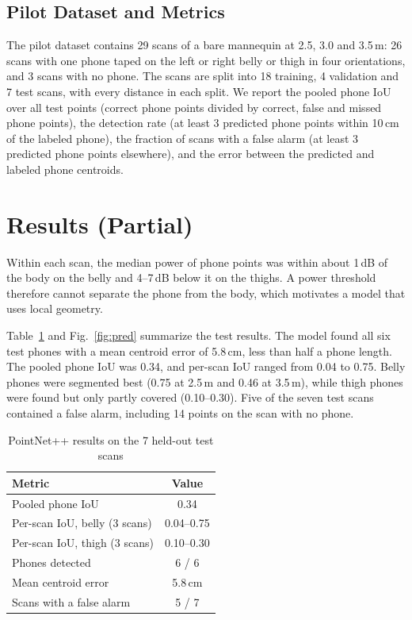 \documentclass[conference]{IEEEtran}
\begin{document}
\subsection{Pilot Dataset and Metrics}
The pilot dataset contains 29 scans of a bare mannequin at 2.5, 3.0 and 3.5\,m: 26 scans with one phone taped on the left or right belly or thigh in four orientations, and 3 scans with no phone. The scans are split into 18 training, 4 validation and 7 test scans, with every distance in each split. We report the pooled phone IoU over all test points (correct phone points divided by correct, false and missed phone points), the detection rate (at least 3 predicted phone points within 10\,cm of the labeled phone), the fraction of scans with a false alarm (at least 3 predicted phone points elsewhere), and the error between the predicted and labeled phone centroids.

\section{Results (Partial)}
Within each scan, the median power of phone points was within about 1\,dB of the body on the belly and 4--7\,dB below it on the thighs. A power threshold therefore cannot separate the phone from the body, which motivates a model that uses local geometry.

Table~\ref{tab:results} and Fig.~\ref{fig:pred} summarize the test results. The model found all six test phones with a mean centroid error of 5.8\,cm, less than half a phone length. The pooled phone IoU was 0.34, and per-scan IoU ranged from 0.04 to 0.75. Belly phones were segmented best (0.75 at 2.5\,m and 0.46 at 3.5\,m), while thigh phones were found but only partly covered (0.10--0.30). Five of the seven test scans contained a false alarm, including 14 points on the scan with no phone.

\begin{table}[t]
\centering
\caption{PointNet++ results on the 7 held-out test scans}
\label{tab:results}
\begin{tabular}{lc}
\toprule
Metric & Value \\
\midrule
Pooled phone IoU & 0.34 \\
Per-scan IoU, belly (3 scans) & 0.04--0.75 \\
Per-scan IoU, thigh (3 scans) & 0.10--0.30 \\
Phones detected & 6 / 6 \\
Mean centroid error & 5.8\,cm \\
Scans with a false alarm & 5 / 7 \\
\bottomrule
\end{tabular}
\end{table}
\end{document}
